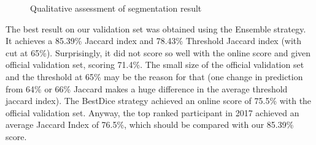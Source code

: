 \begin{figure}
\centering
{}\hfil
{}
\caption{Qualitative assessment of segmentation result}\label{result_samples}
\end{figure}

The best result on our validation set was obtained using the Ensemble strategy.  It achieves a 85.39\% Jaccard index and 78.43\% Threshold Jaccard index (with cut at 65\%). Surprisingly, it did not score so well with the online score and given official validation set, scoring 71.4\%.  The small size of the official validation set and the threshold at 65\% may be the reason for that (one change in prediction from 64\% or 66\% Jaccard makes a huge difference in the average threshold jaccard index). The BestDice strategy achieved an online score of 75.5\% with the official validation set.   Anyway, the top ranked participant in 2017 achieved an average Jaccard Index of 76.5\%, which should be compared with our 85.39\% score.

